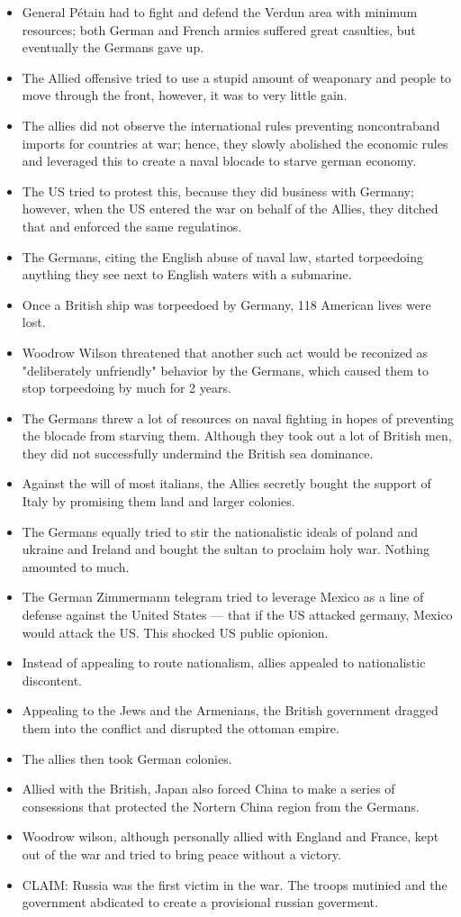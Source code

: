 \documentclass[letterpaper]{article}
\begin{document}
\begin{itemize}
\item General Pétain had to fight and defend the Verdun area with minimum
resources; both German and French armies suffered great casulties, but
eventually the Germans gave up.
\item The Allied offensive tried to use a stupid amount of weaponary and
people to move through the front, however, it was to very little gain.
\item The allies did not observe the international rules preventing
noncontraband imports for countries at war; hence, they slowly
abolished the economic rules and leveraged this to create a naval
blocade to starve german economy.
\item The US tried to protest this, because they did business with Germany;
however, when the US entered the war on behalf of the Allies, they
ditched that and enforced the same regulatinos.
\item The Germans, citing the English abuse of naval law, started
torpeedoing anything they see next to English waters with a submarine.
\item Once a British ship was torpeedoed by Germany, 118 American lives were
lost.
\item Woodrow Wilson threatened that another such act would be reconized as
"deliberately unfriendly" behavior by the Germans, which caused them
to stop torpeedoing by much for 2 years.
\item The Germans threw a lot of resources on naval fighting in hopes of
preventing the blocade from starving them. Although they took out a
lot of British men, they did not successfully undermind the British
sea dominance.
\item Against the will of most italians, the Allies secretly bought the
support of Italy by promising them land and larger colonies.
\item The Germans equally tried to stir the nationalistic ideals of poland
and ukraine and Ireland and bought the sultan to proclaim holy war.
Nothing amounted to much.
\item The German Zimmermann telegram tried to leverage Mexico as a line of
defense against the United States --- that if the US attacked germany,
Mexico would attack the US. This shocked US public opionion.
\item Instead of appealing to route nationalism, allies appealed to
nationalistic discontent.
\item Appealing to the Jews and the Armenians, the British government
dragged them into the conflict and disrupted the ottoman empire.
\item The allies then took German colonies.
\item Allied with the British, Japan also forced China to make a series of
consessions that protected the Nortern China region from the Germans.
\item Woodrow wilson, although personally allied with England and France,
kept out of the war and tried to bring peace without a victory.
\item CLAIM: Russia was the first victim in the war. The troops mutinied and
the government abdicated to create a provisional russian goverment.
\end{itemize}
\end{document}
